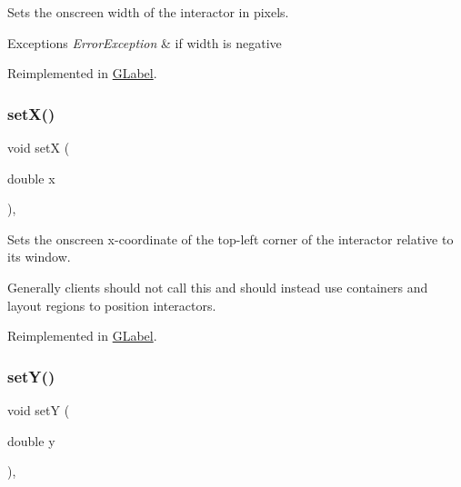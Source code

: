 Sets the onscreen width of the interactor in pixels. 


\begin{DoxyExceptions}{Exceptions}
{\em Error\+Exception} & if width is negative \\
\hline
\end{DoxyExceptions}


Reimplemented in \mbox{\hyperlink{classGLabel_af0c5b6fb4e3c3c9a3fabde548efa93db}{G\+Label}}.

\mbox{\label{classGInteractor_a9c18fcc579333bf9653d13ad2b372e39}} 
\subsubsection{\texorpdfstring{set\+X()}{setX()}}
{\footnotesize\ttfamily void setX (\begin{DoxyParamCaption}\item[{double}]{x }\end{DoxyParamCaption})\hspace{0.3cm}{\ttfamily [virtual]}, {\ttfamily [inherited]}}



Sets the onscreen x-\/coordinate of the top-\/left corner of the interactor relative to its window. 

Generally clients should not call this and should instead use containers and layout regions to position interactors. 

Reimplemented in \mbox{\hyperlink{classGLabel_a173837ba805eaa2411e88834869d3a9c}{G\+Label}}.

\mbox{\label{classGInteractor_a7d57e2a5c35d27feb58fd498a3cf82b9}} 
\subsubsection{\texorpdfstring{set\+Y()}{setY()}}
{\footnotesize\ttfamily void setY (\begin{DoxyParamCaption}\item[{double}]{y }\end{DoxyParamCaption})\hspace{0.3cm}{\ttfamily [virtual]}, {\ttfamily [inherited]}}



